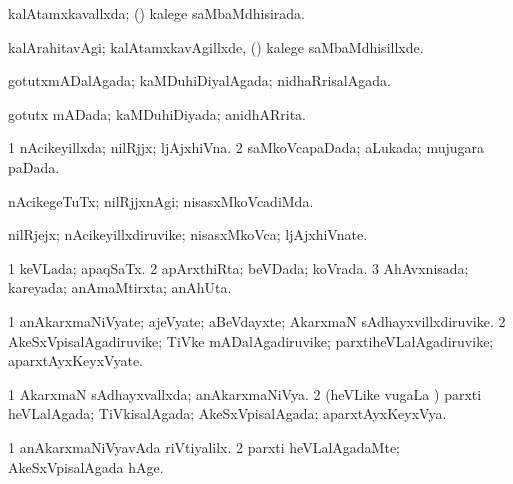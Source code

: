 {\bentry
{} 
\gl{\gu}
\expl{}
\bmng
kalAtamxkavallxda; (\kanmu) kalege saMbaMdhisirada. 
\emng
\eentry

\bentry
{} 
\gl{\kirxvi}
\expl{}
\bmng
kalArahitavAgi; kalAtamxkavAgillxde, (\kanmu) kalege saMbaMdhisillxde. 
\emng
\eentry

\bentry
{} 
\gl{\gu}
\expl{}
\bmng
gotutxmADalAgada; kaMDuhiDiyalAgada; nidhaRrisalAgada. 
\emng
\eentry

\bentry
{} 
\gl{\gu}
\expl{}
\bmng
gotutx mADada; kaMDuhiDiyada; anidhARrita. 
\emng
\eentry

\bentry
{} 
\gl{\gu}
\expl{}
\bmng
\bnum
\num{1} nAcikeyillxda; nilRjjx; ljAjxhiVna. 
\num{2} saMkoVcapaDada; aLukada; mujugara paDada. 
\enum
\emng
\eentry

\bentry
{} 
\gl{\kirxvi}
\expl{}
\bmng
nAcikegeTuTx; nilRjjxnAgi; nisasxMkoVcadiMda. 
\emng
\eentry

\bentry
{} 
\gl{\nA}
\expl{}
\bmng
nilRjejx; nAcikeyillxdiruvike; nisasxMkoVca; ljAjxhiVnate. 
\emng
\eentry

\bentry
{} 
\gl{\gu}
\expl{}
\bmng
\bnum
\num{1} keVLada; apaqSaTx. 
\num{2} apArxthiRta; beVDada; koVrada. 
\num{3} AhAvxnisada; kareyada; anAmaMtirxta; anAhUta. 
\enum
\emng
\eentry

\bentry
{} 
\gl{\nA}
\expl{}
\bmng
\bnum
\num{1} anAkarxmaNiVyate; ajeVyate; aBeVdayxte; AkarxmaN sAdhayxvillxdiruvike. 
\num{2} AkeSxVpisalAgadiruvike; TiVke mADalAgadiruvike; parxtiheVLalAgadiruvike; aparxtAyxKeyxVyate. 
\enum
\emng
\eentry

\bentry
{} 
\gl{\gu}
\expl{}
\bmng
\bnum
\num{1} AkarxmaN sAdhayxvallxda; anAkarxmaNiVya. 
\num{2} (heVLike \mo vugaLa \vi) parxti heVLalAgada; TiVkisalAgada; AkeSxVpisalAgada; aparxtAyxKeyxVya. 
\enum
\emng
\eentry

\bentry
{} 
\gl{\nA}
\expl{}
\bmng
{} 
\emng
\eentry

\bentry
{} 
\gl{\kirxvi}
\expl{}
\bmng
\bnum
\num{1} anAkarxmaNiVyavAda riVtiyalilx. 
\num{2} parxti heVLalAgadaMte; AkeSxVpisalAgada hAge. 
\enum
\emng
\eentry

}
